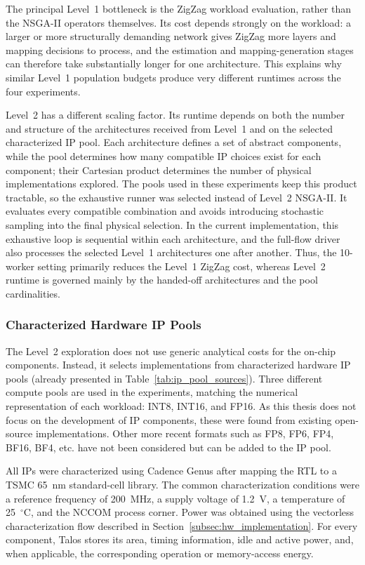 The principal Level~1 bottleneck is the ZigZag workload evaluation,
rather than the NSGA-II operators themselves. Its cost depends strongly
on the workload: a larger or more structurally demanding network gives
ZigZag more layers and mapping decisions to process, and the estimation
and mapping-generation stages can therefore take substantially longer
for one architecture. This explains why similar Level~1 population
budgets produce very different runtimes across the four experiments.

Level~2 has a different scaling factor. Its runtime depends on both the
number and structure of the architectures received from Level~1 and on
the selected characterized IP pool. Each architecture defines a set of
abstract components, while the pool determines how many compatible IP
choices exist for each component; their Cartesian product determines
the number of physical implementations explored. The pools used in
these experiments keep this product tractable, so the exhaustive runner
was selected instead of Level~2 NSGA-II. It evaluates every compatible
combination and avoids introducing stochastic sampling into the final
physical selection. In the current implementation, this exhaustive loop
is sequential within each architecture, and the full-flow driver also
processes the selected Level~1 architectures one after another. Thus,
the 10-worker setting primarily reduces the Level~1 ZigZag cost, whereas
Level~2 runtime is governed mainly by the handed-off architectures and
the pool cardinalities.

\subsubsection{Characterized Hardware IP Pools}

The Level~2 exploration does not use generic analytical costs for the
on-chip components. Instead, it selects implementations from
characterized hardware IP pools (already presented in Table~\ref{tab:ip_pool_sources}). Three different compute pools are
used in the experiments, matching the numerical representation of
each workload: INT8, INT16, and FP16. As this thesis does not focus on the development of IP components, these were found from existing open-source implementations. Other more recent formats such as FP8, FP6, FP4, BF16, BF4, etc. have not been considered but can be added to the IP pool.

All IPs were characterized using Cadence Genus after mapping the RTL
to a TSMC 65~nm standard-cell library. The common characterization
conditions were a reference frequency of 200~MHz, a supply voltage of
1.2~V, a temperature of 25~$^\circ$C, and the NCCOM process corner.
Power was obtained using the vectorless characterization flow
described in Section~\ref{subsec:hw_implementation}. For every
component, Talos stores
its area, timing information, idle and active power, and, when
applicable, the corresponding operation or memory-access energy.

